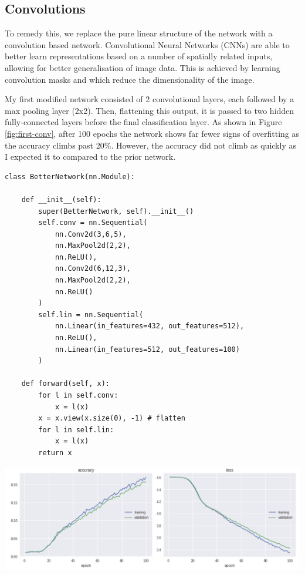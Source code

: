 \documentclass[11pt]{article}
\begin{document}
\subsection{Convolutions}

To remedy this, we replace the pure linear structure of the network with a convolution based network. Convolutional Neural Networks (CNNs) are able to better learn representations based on a number of spatially related inputs, allowing for better generalisation of image data. This is achieved by learning convolution masks and which reduce the dimensionality of the image. 

My first modified network consisted of 2 convolutional layers, each followed by a max pooling layer (2x2). Then, flattening this output, it is passed to two hidden fully-connected layers before the final classification layer. As shown in Figure \ref{fig:first-conv}, after 100 epochs the network shows far fewer signs of overfitting as the accuracy climbs past 20\%. However, the accuracy did not climb as quickly as I expected it to compared to the prior network.

\begin{small}
\begin{verbatim}
class BetterNetwork(nn.Module):

    def __init__(self):
        super(BetterNetwork, self).__init__()
        self.conv = nn.Sequential(
            nn.Conv2d(3,6,5),
            nn.MaxPool2d(2,2),
            nn.ReLU(),
            nn.Conv2d(6,12,3),
            nn.MaxPool2d(2,2),
            nn.ReLU()
        )
        self.lin = nn.Sequential(
            nn.Linear(in_features=432, out_features=512),
            nn.ReLU(),
            nn.Linear(in_features=512, out_features=100)
        )

    def forward(self, x):
        for l in self.conv:
            x = l(x)
        x = x.view(x.size(0), -1) # flatten
        for l in self.lin:
            x = l(x)
        return x
\end{verbatim}
\end{small}


    \begin{center}
        \begin{minipage}{0.75\linewidth}
            \includegraphics[width=\linewidth]{accuracy1}
            \label{fig:first-conv}
        \end{minipage}%
    \end{center}
    
\end{document}
